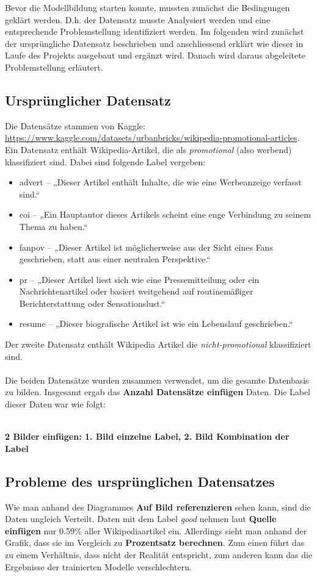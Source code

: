 
Bevor die Modellbildung starten konnte, mussten zunächst die Bedingungen geklärt werden. D.h. der Datensatz musste Analysiert werden und eine entsprechende Problemstellung identifiziert werden. Im folgenden wird zunächst der ursprüngliche Datensatz beschrieben und anschliessend erklärt wie dieser in Laufe des Projekts ausgebaut und ergänzt wird. Danach wird daraus abgeleitete Problemstellung erläutert.

\subsection{Ursprünglicher Datensatz}
Die Datensätze stammen von Kaggle: \url{https://www.kaggle.com/datasets/urbanbricks/wikipedia-promotional-articles}. Ein Datensatz enthält Wikipedia-Artikel, die als \emph{promotional} (also werbend) klassifiziert sind. Dabei sind folgende Label vergeben:
\begin{itemize}
    \item advert – „Dieser Artikel enthält Inhalte, die wie eine Werbeanzeige verfasst sind.“
\item coi – „Ein Hauptautor dieses Artikels scheint eine enge Verbindung zu seinem Thema zu haben.“
\item fanpov – „Dieser Artikel ist möglicherweise aus der Sicht eines Fans geschrieben, statt aus einer neutralen Perspektive.“
\item pr – „Dieser Artikel liest sich wie eine Pressemitteilung oder ein Nachrichtenartikel oder basiert weitgehend auf routinemäßiger Berichterstattung oder Sensationslust.“
\item resume – „Dieser biografische Artikel ist wie ein Lebenslauf geschrieben.“
\end{itemize}
Der zweite Datensatz enthält Wikipedia Artikel die \emph{nicht-promotional} klassifiziert sind.
\\ \\
Die beiden Datensätze wurden zusammen verwendet, um die gesamte Datenbasis zu bilden. Insgesamt ergab das \textbf{Anzahl Datensätze einfügen} Daten. Die Label dieser Daten war wie folgt:

\\
\textbf{2 Bilder einfügen: 1. Bild einzelne Label, 2. Bild Kombination der Label}
\\



\subsection{Probleme des ursprünglichen Datensatzes}
Wie man anhand des Diagrammes \textbf{Auf Bild referenzieren} sehen kann, sind die Daten ungleich Verteilt. Daten mit dem Label \textit{good} nehmen laut \textbf{Quelle einfügen} nur 0.59\% aller Wikipediaartikel ein. Allerdings sieht man anhand der Grafik, dass sie im Vergleich zu \textbf{Prozentsatz berechnen}. Zum einen führt das zu einem Verhältnis, dass nicht der Realität entspricht, zum anderen kann das die Ergebnisse der trainierten Modelle verschlechtern.



